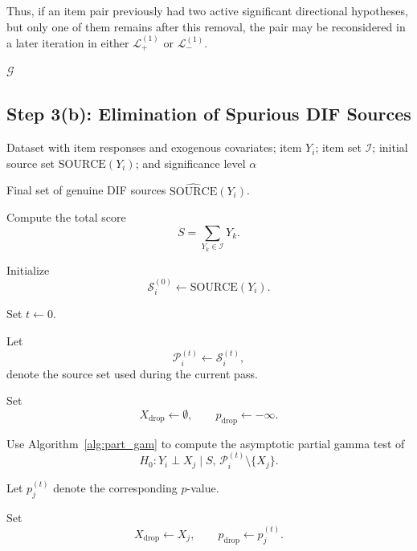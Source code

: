 \begin{breakablealgorithm}
\begin{algorithmic}[1]
    \State Thus, if an item pair previously had two active significant directional
    hypotheses, but only one of them remains after this removal, the pair may be
    reconsidered in a later iteration in either
    $\mathcal{L}_{+}^{(1)}$ or $\mathcal{L}_{-}^{(1)}$.

\EndWhile

\State \Return $\mathcal{G}$

\end{algorithmic}
\end{breakablealgorithm}

\subsection*{Step 3(b): Elimination of Spurious DIF Sources}
\begin{breakablealgorithm}
\caption{Elimination of Spurious DIF Sources for Item $Y_i$}
\label{alg:step3b}

\begin{algorithmic}[1]
\Require Dataset with item responses and exogenous covariates; item $Y_i$; item set $\mathcal{I}$; initial source set $\mathrm{SOURCE}(Y_i)$; and significance level $\alpha$

\Ensure Final set of genuine DIF sources $\widehat{\mathrm{SOURCE}}(Y_i)$.

\State Compute the total score
\[
S = \sum_{Y_k \in \mathcal{I}} Y_k .
\]

\State Initialize
\[
\mathcal{S}_i^{(0)} \gets \mathrm{SOURCE}(Y_i).
\]

\State Set $t \gets 0$.

\Repeat

    \State Let
    \[
    \mathcal{P}_i^{(t)} \gets \mathcal{S}_i^{(t)},
    \]
    denote the source set used during the current pass.

    \State Set
    \[
    X_{\mathrm{drop}} \gets \emptyset,
    \qquad
    p_{\mathrm{drop}} \gets -\infty .
    \]


        \State Use Algorithm~\ref{alg:part_gam} to compute the asymptotic partial gamma test of
        \[
        H_0:
        Y_i \perp X_j
        \mid
        S,\,
        \mathcal{P}_i^{(t)} \setminus \{X_j\}.
        \]

        \State Let $p_j^{(t)}$ denote the corresponding $p$-value.

            \State Set
            \[
            X_{\mathrm{drop}} \gets X_j,
            \qquad
            p_{\mathrm{drop}} \gets p_j^{(t)} .
            \]
        \EndIf


\end{algorithmic}
\end{breakablealgorithm}
